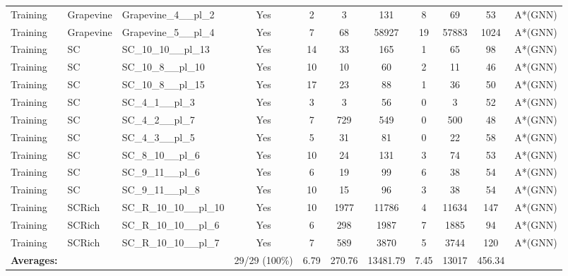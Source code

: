 \documentclass{article}
\begin{document}
\begin{tabular}{lllcccccccc}
Training & Grapevine & Grapevine\_4\_\_pl\_2 & Yes & 2 & 3 & 131 & 8 & 69 & 53 & A*(GNN) \\
Training & Grapevine & Grapevine\_5\_\_pl\_4 & Yes & 7 & 68 & 58927 & 19 & 57883 & 1024 & A*(GNN) \\
Training & SC & SC\_10\_10\_\_pl\_13 & Yes & 14 & 33 & 165 & 1 & 65 & 98 & A*(GNN) \\
Training & SC & SC\_10\_8\_\_pl\_10 & Yes & 10 & 10 & 60 & 2 & 11 & 46 & A*(GNN) \\
Training & SC & SC\_10\_8\_\_pl\_15 & Yes & 17 & 23 & 88 & 1 & 36 & 50 & A*(GNN) \\
Training & SC & SC\_4\_1\_\_pl\_3 & Yes & 3 & 3 & 56 & 0 & 3 & 52 & A*(GNN) \\
Training & SC & SC\_4\_2\_\_pl\_7 & Yes & 7 & 729 & 549 & 0 & 500 & 48 & A*(GNN) \\
Training & SC & SC\_4\_3\_\_pl\_5 & Yes & 5 & 31 & 81 & 0 & 22 & 58 & A*(GNN) \\
Training & SC & SC\_8\_10\_\_pl\_6 & Yes & 10 & 24 & 131 & 3 & 74 & 53 & A*(GNN) \\
Training & SC & SC\_9\_11\_\_pl\_6 & Yes & 6 & 19 & 99 & 6 & 38 & 54 & A*(GNN) \\
Training & SC & SC\_9\_11\_\_pl\_8 & Yes & 10 & 15 & 96 & 3 & 38 & 54 & A*(GNN) \\
Training & SCRich & SC\_R\_10\_10\_\_pl\_10 & Yes & 10 & 1977 & 11786 & 4 & 11634 & 147 & A*(GNN) \\
Training & SCRich & SC\_R\_10\_10\_\_pl\_6 & Yes & 6 & 298 & 1987 & 7 & 1885 & 94 & A*(GNN) \\
Training & SCRich & SC\_R\_10\_10\_\_pl\_7 & Yes & 7 & 589 & 3870 & 5 & 3744 & 120 & A*(GNN) \\
\textbf{Averages:} & & & 29/29 (100\%) & 6.79 & 270.76 & 13481.79 & 7.45 & 13017 & 456.34 & \\
\bottomrule
\end{tabular}
\newpage
\end{document}
